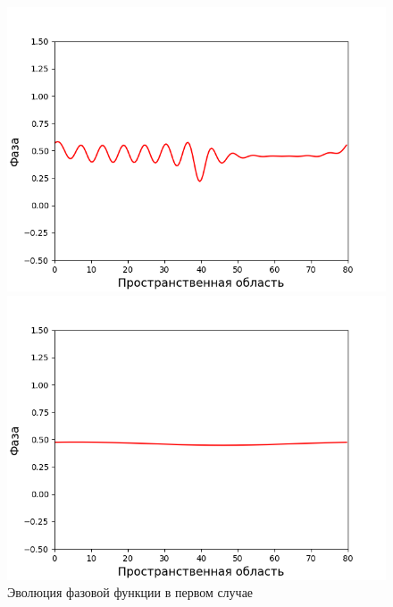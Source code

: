 \begin{figure}[p]
    \centering
    \begin{minipage}{0.49\linewidth}
        \includegraphics[width=\linewidth]{images/4-data_data_50000.bin.png}
    \end{minipage}
    \hfill
    \begin{minipage}{0.49\linewidth}
        \includegraphics[width=\linewidth]{images/4-data_data_1000000.bin.png}
    \end{minipage}
    \caption{Эволюция фазовой функции в первом случае}
    \label{fig:evolution_1}


\end{figure}

